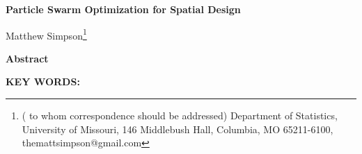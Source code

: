 \documentclass[12pt]{article}
\begin{document}
\thispagestyle{empty} \baselineskip=28pt

\begin{center}
{\LARGE{\bf Particle Swarm Optimization for Spatial Design}}
\end{center}

\baselineskip=12pt
\vskip 2mm
\blind
{
  \begin{center}
    Matthew Simpson\footnote{(\baselineskip=10pt to whom correspondence should be addressed)
      Department of Statistics, University of Missouri,
      146 Middlebush Hall, Columbia, MO 65211-6100, themattsimpson@gmail.com}
  \end{center}
} \fi

\vskip 2mm
\begin{center}
{\large{\bf Abstract}}
\end{center}
\baselineskip=12pt 

\baselineskip=12pt
\par\vfill\noindent
{\bf KEY WORDS:} 

\par\medskip\noindent


\clearpage\pagebreak\newpage {}
\baselineskip=24pt
\end{document}
